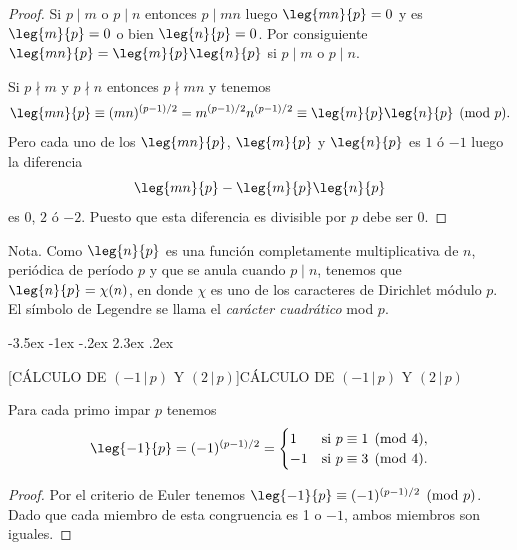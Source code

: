 \documentclass[12pt,a4paper]{book}
\makeatletter
\renewcommand\section{\@startsection{section}{1}{\z@}%
  {-3.5ex \@plus -1ex \@minus -.2ex}%
  {2.3ex \@plus .2ex}%
  {\normalfont\Large\bfseries\raggedright}}
\makeatother
\begin{document}
    \begin{proof}
        Si $p\mid m$ o $p\mid n$ entonces $p\mid mn$ luego $\leg{mn}{p}=0$ y es
        $\leg{m}{p}=0$ o bien $\leg{n}{p}=0$. Por consiguiente
        $\leg{mn}{p}=\leg{m}{p}\leg{n}{p}$ si $p\mid m$ o $p\mid n$.

        Si $p\nmid m$ y $p\nmid n$ entonces $p\nmid mn$ y tenemos
        \begin{equation*}
            \leg{mn}{p}\equiv(mn)^{(p-1)/2}=m^{(p-1)/2}n^{(p-1)/2}\equiv\leg{m}{p}\leg{n}{p}\pmod{p}.
        \end{equation*}
        Pero cada uno de los $\leg{mn}{p}$, $\leg{m}{p}$ y $\leg{n}{p}$ es $1$ ó $-1$
        luego la diferencia
        \begin{equation*}
            \leg{mn}{p}-\leg{m}{p}\leg{n}{p}
        \end{equation*}
        es $0$, $2$ ó $-2$. Puesto que esta diferencia es divisible por $p$ debe ser 0.
    \end{proof}

    Nota. Como $\leg{n}{p}$ es una función completamente multiplicativa de $n$, periódica
    de período $p$ y que se anula cuando $p\mid n$, tenemos que $\leg{n}{p}=\chi(n)$, en
    donde $\chi$ es uno de los caracteres de Dirichlet módulo $p$. El símbolo de Legendre
    se llama el \textit{carácter cuadrático} mod $p$.

    \section[CÁLCULO DE \texorpdfstring{$(-1\,|\,p)$}{(-1|p)} Y \texorpdfstring{$(2\,|\,p)$}{(2|p)}]{CÁLCULO DE \texorpdfstring{$(-1\,|\,p)$}{(-1|p)} Y \texorpdfstring{$(2\,|\,p)$}{(2|p)}}

    \begin{teorema}\label{teo:9-4}
        Para cada primo impar $p$ tenemos
        \begin{equation*}
            \leg{-1}{p}=(-1)^{(p-1)/2}=
            \begin{cases}
                1&\text{si }p\equiv1\pmod{4},\\
                -1&\text{si }p\equiv3\pmod{4}.
            \end{cases}
        \end{equation*}
    \end{teorema}

    \begin{proof}
        Por el criterio de Euler tenemos $\leg{-1}{p}\equiv(-1)^{(p-1)/2}\pmod{p}$. Dado que
        cada miembro de esta congruencia es 1 o $-1$, ambos miembros son iguales.
    \end{proof}
\end{document}
